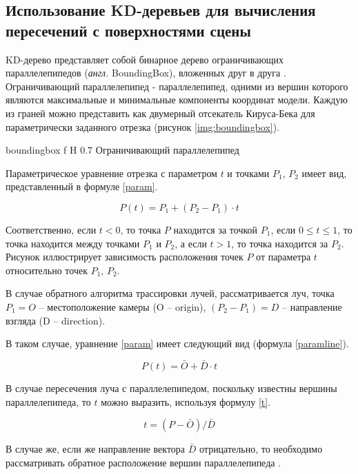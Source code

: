 \subsection{Использование KD-деревьев для вычисления пересечений с поверхностями сцены}

KD-дерево представляет собой бинарное дерево ограничивающих параллелепипедов (\textit{англ.} BoundingBox), вложенных друг в друга \cite{kdtree}. 
Ограничивающий параллелепипед - параллелепипед, одними из вершин которого являются максимальные и минимальные компоненты координат модели. Каждую из граней можно представить как двумерный отсекатель Кируса-Бека для параметрически заданного отрезка \cite{rogers} (рисунок \ref{img:boundingbox}).

{boundingbox}
{f}
{H}
{0.7\textwidth}
{Ограничивающий параллелепипед}

Параметрическое уравнение отрезка с параметром $t$  и точками $P_1$, $P_2$ имеет вид, представленный в формуле \ref{param}.

\begin{equation}
	\label{param}
	P(t) = P_1 + (P_2 - P_1) \cdot t
\end{equation}

Соответственно, если $t < 0$, то точка $P$ находится за точкой $P_1$, если $0 \leq t \leq 1$, то точка находится между точками $P_1$ и $P_2$, а если $t > 1$, то точка находится за $P_2$. Рисунок иллюстрирует зависимость расположения точек $P$ от параметра $t$ относительно точек $P_1$, $P_2$.

В случае обратного алгоритма трассировки лучей, рассматривается луч, точка $P_1 = O$ --  местоположение камеры (O -- origin), $(P_2 - P_1) = D$ -- направление взгляда (D -- direction). 

В таком случае, уравнение \ref{param} имеет следующий вид (формула \ref{paramline}).

\begin{equation}
	\label{paramline}
	P(t) =  \bar{O} + \bar{D} \cdot t
\end{equation}

В случае пересечения луча с параллелепипедом, поскольку известны вершины параллелепипеда, то $t$ можно выразить, используя формулу \ref{t}.

\begin{equation}
	\label{t}
	t = (P - \bar{O}) / \bar{D}
\end{equation}

В случае же,  если же направление вектора $\bar{D}$ отрицательно, то необходимо рассматривать обратное расположение вершин параллелепипеда \cite{rogers}.

